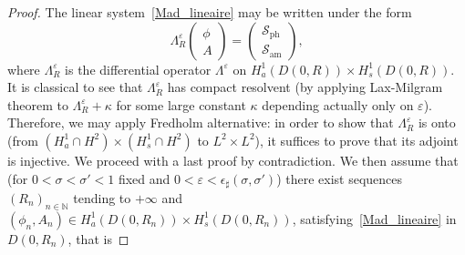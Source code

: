 \documentclass[AHL,Unicode,longabstracts,published]{cedram}
\newcommand*\N{\mathbb N}
\newcommand{\amm}{\mathrm{am}}
\newcommand{\phl}{\mathrm{ph}}
\newcommand*\BS{\mathcal{S}}
\newcommand*\ii{\infty}
\newcommand*\e{\varepsilon}
\newcommand*\ep{\epsilon}
\newcommand*\s{\sigma}
\begin{document}
\begin{proof}
The linear system~\eqref{Mad_lineaire} may be written under the form
\begin{equation*}
\Lambda^\e_R
\begin{pmatrix}
\phi \\ A
\end{pmatrix} =
\begin{pmatrix} \BS_{\phl} \\ \BS_{\amm}
\end{pmatrix},
\end{equation*}
where $ \Lambda^\e_R $ is the differential operator $ \Lambda^\e $ on $ H^{1}_a (D(0,R)) \times H^{1}_s (D(0,R)) $. It is classical to see that $ \Lambda^\e_R $ has compact resolvent (by applying Lax-Milgram theorem to $ \Lambda_R^\e + \kappa $ for some large constant $ \kappa $ depending actually only on $ \e $). Therefore, we may apply Fredholm alternative: in order to show that $ \Lambda^\e_R $ is onto (from $ (H^1_a \cap H^2) \times (H^1_s \cap H^2) $ to $ L^2 \times L^2 $), it suffices to prove that its adjoint is injective. We proceed with a last proof by contradiction. We then assume that (for $ 0 < \s < \s' <1 $ fixed and $ 0 < \e < \ep_\sharp (\s, \s') $) there exist sequences $ (R_n)_{n \in \N} $ tending to $ + \ii $ and $ (\phi_n, A_n) \in H^1_{a } (D(0,R_n)) \times H^1_{ s } (D(0,R_n))$, satisfying~\eqref{Mad_lineaire} in $ D(0,R_n)$, that is


\end{proof}
\end{document}
